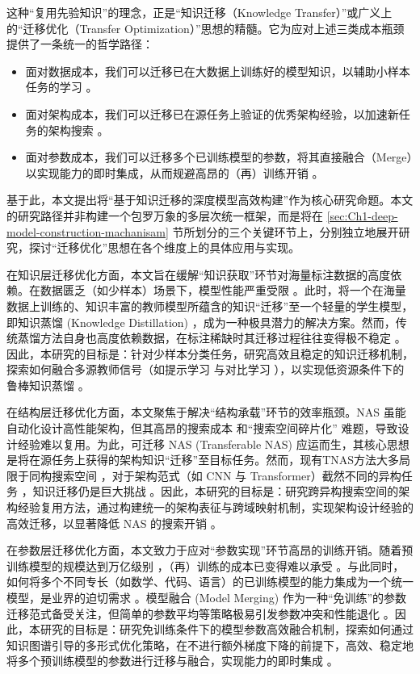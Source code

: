\documentclass[../main.tex]{subfiles}
\begin{document}
这种“复用先验知识”的理念，正是“知识迁移（Knowledge Transfer）”或广义上的“迁移优化（Transfer Optimization）”思想的精髓。它为应对上述三类成本瓶颈提供了一条统一的哲学路径：

\begin{itemize}[leftmargin=3em]
	\item 面对数据成本，我们可以迁移已在大数据上训练好的模型知识，以辅助小样本任务的学习 。
	\item 面对架构成本，我们可以迁移已在源任务上验证的优秀架构经验，以加速新任务的架构搜索 。
	\item 面对参数成本，我们可以迁移多个已训练模型的参数，将其直接融合（Merge）以实现能力的即时集成，从而规避高昂的（再）训练开销 。
\end{itemize}

基于此，本文提出将“基于知识迁移的深度模型高效构建”作为核心研究命题。本文的研究路径并非构建一个包罗万象的多层次统一框架，而是将在 \ref{sec:Ch1-deep-model-construction-machanisam} 节所划分的三个关键环节上，分别独立地展开研究，探讨“迁移优化”思想在各个维度上的具体应用与实现。

在知识层迁移优化方面，本文旨在缓解“知识获取”环节对海量标注数据的高度依赖。在数据匮乏（如少样本）场景下，模型性能严重受限 。此时，将一个在海量数据上训练的、知识丰富的教师模型所蕴含的知识“迁移”至一个轻量的学生模型，即知识蒸馏 (Knowledge Distillation) ，成为一种极具潜力的解决方案。然而，传统蒸馏方法自身也高度依赖数据，在标注稀缺时其迁移过程往往变得极不稳定 。因此，本研究的目标是：针对少样本分类任务，研究高效且稳定的知识迁移机制，探索如何融合多源教师信号（如提示学习 与对比学习 ），以实现低资源条件下的鲁棒知识蒸馏 。

在结构层迁移优化方面，本文聚焦于解决“结构承载”环节的效率瓶颈。NAS 虽能自动化设计高性能架构，但其高昂的搜索成本 和“搜索空间碎片化” 难题，导致设计经验难以复用。为此，可迁移 NAS (Transferable NAS) 应运而生，其核心思想是将在源任务上获得的架构知识“迁移”至目标任务。然而，现有TNAS方法大多局限于同构搜索空间 ，对于架构范式（如 CNN 与 Transformer）截然不同的异构任务 ，知识迁移仍是巨大挑战 。因此，本研究的目标是：研究跨异构搜索空间的架构经验复用方法，通过构建统一的架构表征与跨域映射机制，实现架构设计经验的高效迁移，以显著降低 NAS 的搜索开销 。

在参数层迁移优化方面，本文致力于应对“参数实现”环节高昂的训练开销。随着预训练模型的规模达到万亿级别 ，（再）训练的成本已变得难以承受 。与此同时，如何将多个不同专长（如数学、代码、语言）的已训练模型的能力集成为一个统一模型，是业界的迫切需求 。模型融合 (Model Merging) 作为一种“免训练”的参数迁移范式备受关注，但简单的参数平均等策略极易引发参数冲突和性能退化 。因此，本研究的目标是：研究免训练条件下的模型参数高效融合机制，探索如何通过知识图谱引导的多形式优化策略，在不进行额外梯度下降的前提下，高效、稳定地将多个预训练模型的参数进行迁移与融合，实现能力的即时集成 。
\end{document}
